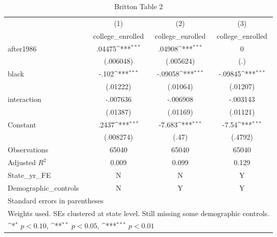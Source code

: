 \begin{table}[htbp]\centering
\def\sym#1{\ifmmode^{#1}\else\(^{#1}\)\fi}
\caption{Britton Table 2}
\begin{tabular}{l*{3}{c}}
\hline\hline
                    &\multicolumn{1}{c}{(1)}&\multicolumn{1}{c}{(2)}&\multicolumn{1}{c}{(3)}\\
                    &\multicolumn{1}{c}{college\_enrolled}&\multicolumn{1}{c}{college\_enrolled}&\multicolumn{1}{c}{college\_enrolled}\\
\hline
after1986           &      .04475\sym{***}&      .04908\sym{***}&           0         \\
                    &   (.006048)         &   (.005624)         &         (.)         \\
[1em]
black               &       -.102\sym{***}&     -.09058\sym{***}&     -.09845\sym{***}\\
                    &    (.01222)         &    (.01064)         &    (.01207)         \\
[1em]
interaction         &    -.007636         &    -.006908         &    -.003143         \\
                    &    (.01387)         &    (.01169)         &    (.01121)         \\
[1em]
Constant            &       .2437\sym{***}&      -7.683\sym{***}&       -7.54\sym{***}\\
                    &   (.008274)         &       (.47)         &     (.4792)         \\
\hline
Observations        &       65040         &       65040         &       65040         \\
Adjusted \(R^{2}\)  &       0.009         &       0.099         &       0.129         \\
State\_yr\_FE         &           N         &           N         &           Y         \\
Demographic\_controls&           N         &           Y         &           Y         \\
\hline\hline
\multicolumn{4}{l}{\footnotesize Standard errors in parentheses}\\
\multicolumn{4}{l}{\footnotesize Weights used. SEs clustered at state level. Still missing some demographic controls.}\\
\multicolumn{4}{l}{\footnotesize \sym{*} \(p<0.10\), \sym{**} \(p<0.05\), \sym{***} \(p<0.01\)}\\
\end{tabular}
\end{table}
